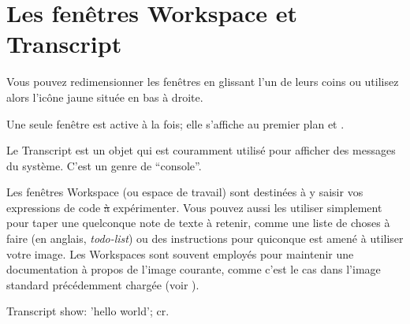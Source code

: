 \documentclass[a4paper,10pt,twoside]{book}
\begin{document}
\section{Les fenêtres Workspace et Transcript}

Vous pouvez redimensionner les fenêtres en glissant l'un de leurs
coins ou  utilisez alors l'icône jaune située en bas à droite.

Une seule fenêtre est active à la fois; elle s'affiche au premier plan
et . %

Le Transcript est un objet qui est couramment utilisé pour afficher
des messages du système. C'est un genre de ``console''.

Les fenêtres Workspace (ou espace de travail) sont destinées à
y saisir vos expressions de code \st à expérimenter.
Vous pouvez aussi les utiliser simplement pour taper une quelconque
note de texte à retenir, comme une liste de choses à faire (en
anglais, \emph{todo-list}) ou des instructions pour quiconque est
amené à utiliser votre image.
Les Workspaces sont souvent employés pour maintenir une
documentation à propos de l'image courante, comme c'est le cas
dans l'image standard précédemment chargée (voir
).

\begin{code}{}
Transcript show: 'hello world'; cr.
\end{code}
\end{document}
